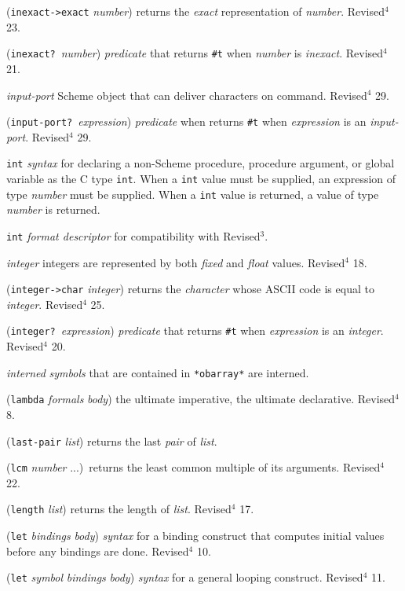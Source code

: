 \documentclass[10pt,twocolumn]{article}
\begin{document}
(\texttt{inexact->exact} \emph{number}) returns the \emph{exact}
representation of \emph{number}.  Revised$^4$ 23.

(\texttt{inexact?}\ \emph{number}) \emph{predicate} that returns \texttt{\#t} when
\emph{number} is \emph{inexact}.  Revised$^4$ 21.

\emph{input-port} Scheme object that can deliver characters on command.
Revised$^4$ 29.

(\texttt{input-port?}\ \emph{expression}) \emph{predicate} when returns \texttt{\#t}
when \emph{expression} is an \emph{input-port}.  Revised$^4$ 29.

\texttt{int} \emph{syntax} for declaring a non-Scheme procedure, procedure
argument, or global variable as the C type \texttt{int}.  When a \texttt{int}
value must be supplied, an expression of type \emph{number} must be
supplied.  When a \texttt{int} value is returned, a value of type
\emph{number} is returned.

\texttt{int} \emph{format descriptor} for compatibility with Revised$^3$.

\emph{integer} integers are represented by both \emph{fixed} and \emph{float} values.
Revised$^4$ 18.

(\texttt{integer->char} \emph{integer}) returns the \emph{character} whose ASCII
code is equal to \emph{integer}.  Revised$^4$ 25.

(\texttt{integer?}\ \emph{expression}) \emph{predicate} that returns \texttt{\#t} when
\emph{expression} is an \emph{integer}.  Revised$^4$ 20.

\emph{interned} \qquad \emph{symbols} that are contained in \texttt{*obarray*} are
interned.

(\texttt{lambda} \emph{formals} \emph{body}) the ultimate imperative, the
ultimate declarative.  Revised$^4$ 8.

(\texttt{last-pair} \emph{list}) returns the last \emph{pair} of \emph{list}.

(\texttt{lcm} \emph{number} ...)\ returns the least common multiple of its
arguments.  Revised$^4$ 22.

(\texttt{length} \emph{list}) returns the length of \emph{list}.  Revised$^4$
17.

(\texttt{let} \emph{bindings} \emph{body}) \emph{syntax} for a binding construct
that computes initial values before any bindings are done.
Revised$^4$ 10.

(\texttt{let} \emph{symbol} \emph{bindings} \emph{body}) \emph{syntax} for a general
looping construct. Revised$^4$ 11.
\end{document}
